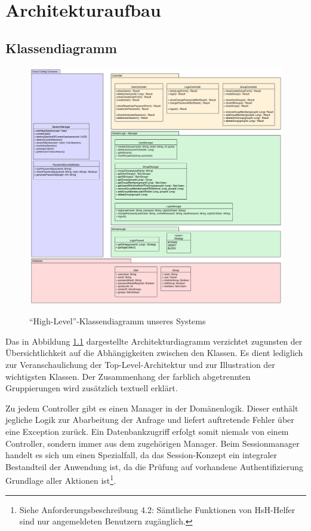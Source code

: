 \documentclass[12pt,DIV14,BCOR10mm,a4paper,parskip=half-,headsepline,headinclude,english,ngerman,bibliography=totocnumbered]{scrreprt}
\begin{document}
\vspace*{-3cm}

\tableofcontents  %

\chapter{Architekturaufbau}
\section{Klassendiagramm}

\begin{figure}[!htb]
  \hspace*{-2.5cm}
  \includegraphics[width=0.93\paperwidth]{resources/class_diagram.png}
  \label{architecture:class_diagram}
  \caption{\enquote{High-Level}-Klassendiagramm unseres Systems}
\end{figure}

Das in Abbildung \ref{architecture:class_diagram} dargestellte Architekturdiagramm verzichtet zugunsten der Über\-sichtlichkeit auf die Abhängig\-keiten zwischen den Klassen. Es dient lediglich zur Veranschaulichung der Top-Level-Architektur und zur Illustration der wichtigsten Klassen. Der Zusammenhang der farblich abgetrennten Gruppierungen wird zusätzlich textuell erklärt.

Zu jedem Controller gibt es einen Manager in der Domänenlogik.
Dieser enthält jegliche Logik zur Abarbeitung der Anfrage und liefert auftretende Fehler über eine Exception zurück. Ein Datenbankzugriff erfolgt somit niemals von einem Controller, sondern immer aus dem zugehörigen Manager.
Beim Sessionmanager handelt es sich um einen Spezialfall, da das Session-Konzept ein integraler Bestandteil der Anwendung ist, da die Prüfung auf vorhandene Authentifizierung Grundlage aller Aktionen ist\footnote{Siehe Anforderungsbeschreibung 4.2: Sämtliche Funktionen von HsH-Helfer sind nur angemeldeten Benutzern zugänglich.}.
\end{document}
